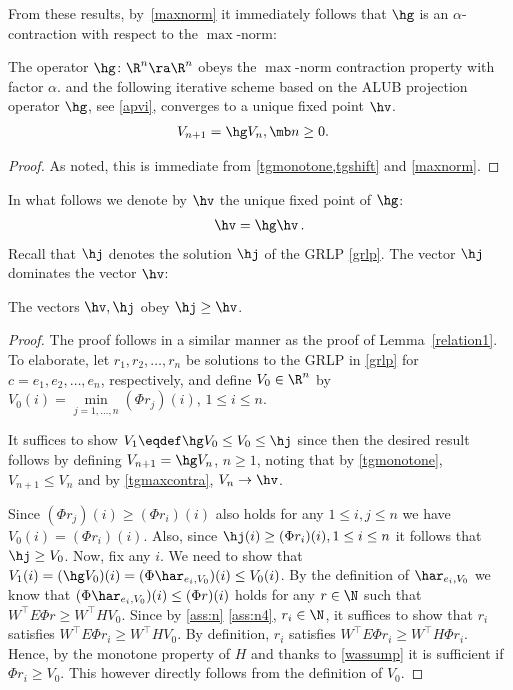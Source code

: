 From these results, by~\cref{maxnorm} it immediately follows that $\hg$ is an $\alpha$-contraction with respect to the $\max$-norm:
\begin{theorem}\label{tgmaxcontra}
The operator $\hg \colon \R^n\ra \R^n$ obeys the $\max$-norm contraction property with factor $\alpha$.
 and the following iterative scheme based on the ALUB projection operator $\hg$, see \eqref{apvi}, converges to a unique fixed point $\hv$.
\begin{align}\label{apvi}
V_{n+1}&=\hg V_n,\mb n\geq 0.
\end{align}
\fi
\end{theorem}
\begin{proof}
As noted, this is immediate from \cref{tgmonotone,tgshift} and \cref{maxnorm}.
\end{proof}
In what follows we denote by $\hv$ the unique fixed point of $\hg$:
\begin{align*}
\hv = \hg \hv\,.
\end{align*}
Recall that $\hj$ denotes the solution $\hj$ of the GRLP \eqref{grlp}. 
The vector $\hj$ dominates the vector $\hv$:
\begin{lemma}\label{relation2}
The vectors $\hv,\hj$ obey $\hj\geq\hv$.
\end{lemma}
\begin{proof}
The proof follows in a similar manner as the proof of Lemma~\ref{relation1}. To elaborate, let $ r_1,  r_2,\ldots, r_n$ be solutions to the GRLP in \eqref{grlp} for $c=e_1, e_2,\ldots,e_n$, respectively,
and define $V_0\in \R^n$ by $V_0(i)=\underset{j=1,\ldots,n}{\min}(\Phi r_j)(i)$, $1\le i \le n$.

It suffices to show $V_1\eqdef \hg V_0 \le V_0 \le \hj$ since then the desired result follows
by defining $V_{n+1} = \hg V_n$, $n\ge 1$, noting that by \cref{tgmonotone}, $V_{n+1}\le V_{n}$ and by  \cref{tgmaxcontra}, $V_n \to \hv$.

Since $(\Phi r_j)(i) \ge (\Phi r_i)(i)$ also holds for any $1\leq i,j\leq n$ we have $V_0(i)  = (\Phi r_i)(i)$. Also, since $\hj(i) \ge (\Phi r_i)(i),1\leq i \leq n$ it follows that $\hj\geq V_0$. 
Now,  fix any $i$. 
We need to show that $V_1(i)=(\hg V_0)(i) = (\Phi \har_{e_i,V_0})(i) \leq V_0(i)$. 
By the definition of $\har_{e_i,V_0}$ we know that $(\Phi \har_{e_i,V_0})(i) \le (\Phi r)(i)$
holds for any $r\in \N$ such that $W^\top E \Phi r \ge W^\top H V_0$. 
Since by \cref{ass:n} \eqref{ass:n4}, $r_i \in \N$, 
 it suffices to show that $r_i$ satisfies $W^\top E \Phi r_i \ge W^\top H V_0$. 
 By definition, $r_i$ satisfies $W^\top E \Phi r_i \ge W^\top H \Phi r_i$.
 Hence, by the monotone property of $H$ and thanks to
  \cref{wassump} it is sufficient if $\Phi r_i \ge V_0$.
This however directly follows from the definition of $V_0$.
\end{proof}
